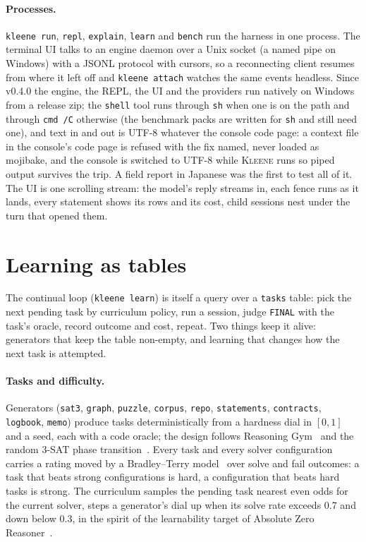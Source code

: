 \documentclass[11pt,a4paper]{article}
\newcommand{\kleene}{\textsc{Kleene}}
\newcommand{\code}[1]{\texttt{#1}}
\begin{document}
\paragraph{Processes.} \code{kleene run}, \code{repl}, \code{explain},
\code{learn} and \code{bench} run the harness in one process. The terminal UI
talks to an engine daemon over a Unix socket (a named pipe on Windows) with
a JSONL protocol with cursors, so a reconnecting client resumes from where
it left off and \code{kleene attach} watches the same events headless.
Since v0.4.0 the engine, the REPL, the UI and the providers run natively on
Windows from a release zip; the \code{shell} tool runs through \code{sh}
when one is on the path and through \code{cmd /C} otherwise (the benchmark
packs are written for \code{sh} and still need one), and text in and out
is UTF-8 whatever the console code page: a context file in the console's
code page is refused with the fix named, never loaded as mojibake, and the
console is switched to UTF-8 while \kleene{} runs so piped output survives
the trip. A field report in Japanese was the first to test all of it. The UI is one scrolling stream: the model's
reply streams in, each fence runs as it lands, every statement shows its rows
and its cost, child sessions nest under the turn that opened them.

\section{Learning as tables}
\label{sec:learning}

The continual loop (\code{kleene learn}) is itself a query over a \code{tasks}
table: pick the next pending task by curriculum policy, run a session, judge
\code{FINAL} with the task's oracle, record outcome and cost, repeat. Two things
keep it alive: generators that keep the table non-empty, and learning that
changes how the next task is attempted.

\paragraph{Tasks and difficulty.} Generators (\code{sat3}, \code{graph},
\code{puzzle}, \code{corpus}, \code{repo}, \code{statements},
\code{contracts}, \code{logbook}, \code{memo}) produce tasks deterministically
from a hardness dial in $[0,1]$ and a seed, each with a code oracle; the design
follows Reasoning Gym~\citep{stojanovski2025reasoninggym} and the random 3-SAT
phase transition~\citep{mitchell1992hard}. Every task and every solver
configuration carries a rating moved by a Bradley--Terry
model~\citep{bradley1952rank} over solve and fail outcomes: a task that beats
strong configurations is hard, a configuration that beats hard tasks is strong.
The curriculum samples the pending task nearest even odds for the current
solver, steps a generator's dial up when its solve rate exceeds 0.7 and down
below 0.3, in the spirit of the learnability target of Absolute Zero
Reasoner~\citep{zhao2025absolutezero}.
\end{document}
